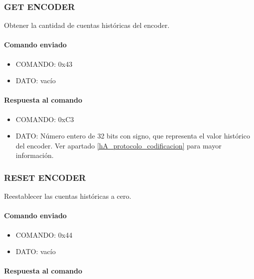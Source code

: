 \subsubsection{GET ENCODER}
\label{hA_protocolo_get_encoder}

Obtener la cantidad de cuentas hist\'oricas del encoder.

\paragraph*{Comando enviado}

\begin{itemize}
	\item{COMANDO:} 0x43
	\item{DATO:} vac\'io
\end{itemize}

\paragraph*{Respuesta al comando}

\begin{itemize}
	\item{COMANDO:} 0xC3
	\item{DATO:} N\'umero entero de 32 bits con signo, que representa el valor hist\'orico del encoder.
		Ver apartado \ref{hA_protocolo_codificacion} para mayor informaci\'on.
\end{itemize}

\subsubsection{RESET ENCODER}
\label{hA_protocolo_reset_encoder}

Reestablecer las cuentas hist\'oricas a cero.

\paragraph*{Comando enviado}

\begin{itemize}
	\item{COMANDO:} 0x44
	\item{DATO:} vac\'io
\end{itemize}

\paragraph*{Respuesta al comando}


